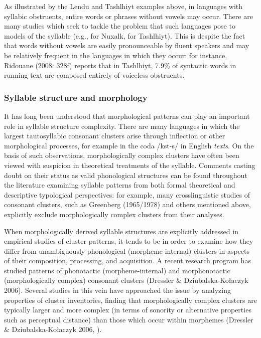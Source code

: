   As illustrated by the Lendu and Tashlhiyt examples above, in languages with syllabic obstruents, entire words or phrases without vowels may occur. There are many studies which seek to tackle the problem that such languages pose to models of the syllable (e.g., \citealt{Bagemihl1991} for Nuxalk, \citealt{Coleman2001} for Tashlhiyt). This is despite the fact that words without vowels are easily pronounceable by fluent speakers and may be relatively frequent in the languages in which they occur: for instance, Ridouane (2008: 328f) reports that in Tashlhiyt, 7.9\% of syntactic words in running text are composed entirely of voiceless obstruents. 

\subsubsection{{Syllable} {structure} {and} {morphology}}\label{sec:1.1.2.5}

  It has long been understood that morphological patterns can play an important role in syllable structure complexity. There are many languages in which the largest tautosyllabic consonant clusters arise through inflection or other morphological processes, for example in the coda /kst-s/ in English \textit{texts}. On the basis of such observations, morphologically complex clusters have often been viewed with suspicion in theoretical treatments of the syllable. Comments casting doubt on their status as valid phonological structures can be found throughout the literature examining syllable patterns from both formal theoretical and descriptive typological perspectives: for example, many crosslinguistic studies of consonant clusters, such as Greenberg (1965/1978) and others mentioned above, explicitly exclude morphologically complex clusters from their analyses. 

  When morphologically derived syllable structures are explicitly addressed in empirical studies of cluster patterns, it tends to be in order to examine how they differ from unambiguously phonological (morpheme-internal) clusters in aspects of their composition, processing, and acquisition. A recent research program has studied patterns of phonotactic (morpheme-internal) and morphonotactic (morphologically complex) consonant clusters (Dressler \& Dziubalska-Kołaczyk 2006). Several studies in this vein have approached the issue by analyzing properties of cluster inventories, finding that morphologically complex clusters are typically larger and more complex (in terms of sonority or alternative properties such as perceptual distance) than those which occur within morphemes (Dressler \& Dziubalska-Kołaczyk 2006, \citealt{Orzechowska2012}). 


